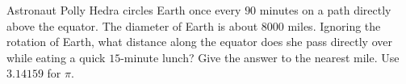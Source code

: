 Astronaut Polly Hedra circles Earth once every $90$ minutes on a path directly above the equator. The diameter of Earth is about $8000$ miles. Ignoring the rotation of Earth, what distance along the equator does she pass directly over while eating a quick $15$-minute lunch? Give the answer to the nearest mile. Use $3.14159$ for $\pi$.
